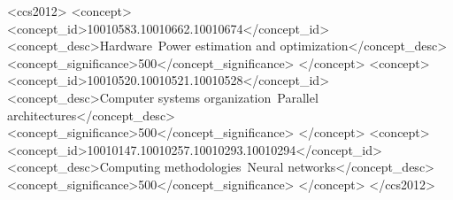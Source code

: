 \documentclass[manuscript,screen,review,anonymous]{acmart}
\begin{document}
\begin{abstract}
  
\end{abstract}

\begin{CCSXML}
<ccs2012>
   <concept>
       <concept_id>10010583.10010662.10010674</concept_id>
       <concept_desc>Hardware~Power estimation and optimization</concept_desc>
       <concept_significance>500</concept_significance>
       </concept>
   <concept>
       <concept_id>10010520.10010521.10010528</concept_id>
       <concept_desc>Computer systems organization~Parallel architectures</concept_desc>
       <concept_significance>500</concept_significance>
       </concept>
   <concept>
       <concept_id>10010147.10010257.10010293.10010294</concept_id>
       <concept_desc>Computing methodologies~Neural networks</concept_desc>
       <concept_significance>500</concept_significance>
       </concept>
 </ccs2012>
\end{CCSXML}




\maketitle















\end{document}
